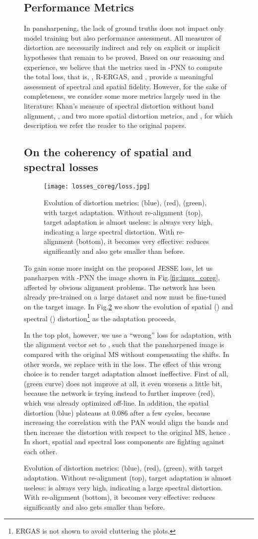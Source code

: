 \documentclass[journal]{IEEEtran}
\begin{document}
\begin{figure}
\subsection{Performance Metrics}

In pansharpening, the lack of ground truths does not impact only model training but also performance assessment.
All measures of distortion are necessarily indirect and rely on explicit or implicit hypotheses that remain to be proved.
Based on our reasoning and experience,
we believe that the metrics used in -PNN to compute the total loss, that is, , R-ERGAS, and ,
provide a meaningful assessment of spectral and spatial fidelity.
However, for the sake of completeness,
we consider some more metrics largely used in the literature:
Khan's measure of spectral distortion without band alignment, ,
and two more spatial distortion metrics,  \cite{Alparone2008} and  \cite{Alparone2018}, for which description we refer the reader to the original papers.



\subsection{On the coherency of spatial and spectral losses}

\begin{figure}
\centering
\texttt{[image: losses\_coreg/loss.jpg]}
\caption{
Evolution of distortion metrics:  (blue),  (red),  (green), with target adaptation.
Without re-alignment (top), target adaptation is almost useless:  is always very high, indicating a large spectral distortion.
With re-alignment (bottom), it becomes very effective:  reduces significantly and also  gets smaller than before.
}
\label{fig:align_no_yes}
\end{figure}

To gain some more insight on the proposed JESSE loss, let us pansharpen with -PNN the image shown in Fig.\ref{fig:imgs_coreg},
affected by obvious alignment problems.
The network has been already pre-trained on a large dataset and now must be fine-tuned on the target image.
In Fig.\ref{fig:align_no_yes} we show the evolution of spatial () and spectral () distortion\footnote{ERGAS is not shown to avoid cluttering the plots.}
as the adaptation proceeds,

In the top plot, however, we use a ``wrong'' loss for adaptation, with the alignment vector set to ,
such that the pansharpened image is compared with the original MS without compensating the shifts.
In other words, we replace  with  in the loss.
The effect of this wrong choice is to render target adaptation almost ineffective.
First of all,  (green curve) does not improve at all, it even worsens a little bit,
because the network is trying instead to further improve  (red), which was already optimized off-line.
In addition,
the spatial distortion  (blue) plateaus at 0.086 after a few cycles,
because increasing the correlation with the PAN would align the bands and then increase the distortion with respect to the original MS, hence .
In short, spatial and spectral loss components are fighting against each other.


\end{figure}
\end{document}
